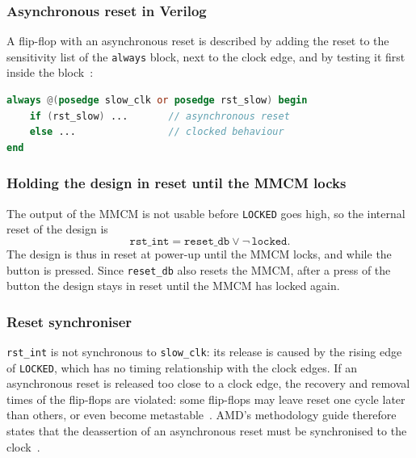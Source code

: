 \documentclass{article}
\begin{document}
\subsubsection{Asynchronous reset in Verilog}
A flip-flop with an asynchronous reset is described by adding the reset to the
sensitivity list of the \texttt{always} block, next to the clock edge, and by
testing it first inside the block~\cite[Flip-Flops, Registers, and Latches]{ug901}:
\begin{lstlisting}[language=Verilog]
always @(posedge slow_clk or posedge rst_slow) begin
    if (rst_slow) ...       // asynchronous reset
    else ...                // clocked behaviour
end
\end{lstlisting}

\subsubsection{Holding the design in reset until the MMCM locks}
The output of the MMCM is not usable before \texttt{LOCKED} goes high, so the
internal reset of the design is
\begin{equation}
  \texttt{rst\_int} = \texttt{reset\_db} \lor \lnot\,\texttt{locked}.
\end{equation}
The design is thus in reset at power-up until the MMCM locks, and while the
button is pressed. Since \texttt{reset\_db} also resets the MMCM, after a press
of the button the design stays in reset until the MMCM has locked again.

\subsubsection{Reset synchroniser}
\texttt{rst\_int} is not synchronous to \texttt{slow\_clk}: its release is caused
by the rising edge of \texttt{LOCKED}, which has no timing relationship with the
clock edges. If an asynchronous reset is released too close to a clock edge, the
recovery and removal times of the flip-flops are violated: some flip-flops may
leave reset one cycle later than others, or even become
metastable~\cite[Synchronous Reset vs.\ Asynchronous Reset]{ug949}. AMD's
methodology guide therefore states that the deassertion of an asynchronous reset
must be synchronised to the clock~\cite[Synchronous Reset vs.\ Asynchronous Reset]{ug949}.
\end{document}
